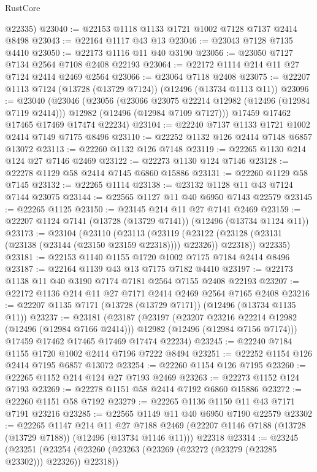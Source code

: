\begin{lexlean}{RustCore}
\begin{coremodule}
      @22335)
@23040 := @22153 @1118 @1133 @1721 @1002 @7128 @7137 @2414 @8498
@23043 := @22164 @1117 @43 @13
@23046 := @23043 @7128 @7135 @4410
@23050 := @22173 @1116 @11 @40 @3190
@23056 := @23050 @7127 @7134 @2564 @7108 @2408 @22193
@23064 := @22172 @1114 @214 @11 @27 @7124 @2414 @2469 @2564
@23066 := @23064 @7118 @2408
@23075 := @22207 @1113 @7124 (@13728 (@13729 @7124)) (@12496 (@13734 @1113 @11))
@23096 := @23040
    (@23046
      (@23056
        (@23066 @23075 @22214 @12982 (@12496 (@12984 @7119 @2414)))
        @12982
        (@12496 (@12984 @7109 @7127)))
      @17459
      @17462
      @17465
      @17469
      @17474
      @22234)
@23104 := @22240 @7137 @1133 @1721 @1002 @2414 @7149 @7175 @8496
@23110 := @22252 @1132 @126 @2414 @7148 @6857 @13072
@23113 := @22260 @1132 @126 @7148
@23119 := @22265 @1130 @214 @124 @27 @7146 @2469
@23122 := @22273 @1130 @124 @7146
@23128 := @22278 @1129 @58 @2414 @7145 @6860 @15886
@23131 := @22260 @1129 @58 @7145
@23132 := @22265 @1114
@23138 := @23132 @1128 @11 @43 @7124 @7144 @23075
@23144 := @22565 @1127 @11 @40 @6950 @7143 @22579
@23145 := @22265 @1125
@23150 := @23145 @214 @11 @27 @7141 @2469
@23159 := @22207 @1124 @7141 (@13728 (@13729 @7141)) (@12496 (@13734 @1124 @11))
@23173 := @23104
    (@23110
      (@23113
        (@23119 (@23122 (@23128 (@23131 (@23138 (@23144 (@23150 @23159 @22318)))) @22326)) @22318))
      @22335)
@23181 := @22153 @1140 @1155 @1720 @1002 @7175 @7184 @2414 @8496
@23187 := @22164 @1139 @43 @13 @7175 @7182 @4410
@23197 := @22173 @1138 @11 @40 @3190 @7174 @7181 @2564 @7155 @2408 @22193
@23207 := @22172 @1136 @214 @11 @27 @7171 @2414 @2469 @2564 @7165 @2408
@23216 := @22207 @1135 @7171 (@13728 (@13729 @7171)) (@12496 (@13734 @1135 @11))
@23237 := @23181
    (@23187
      (@23197
        (@23207 @23216 @22214 @12982 (@12496 (@12984 @7166 @2414)))
        @12982
        (@12496 (@12984 @7156 @7174)))
      @17459
      @17462
      @17465
      @17469
      @17474
      @22234)
@23245 := @22240 @7184 @1155 @1720 @1002 @2414 @7196 @7222 @8494
@23251 := @22252 @1154 @126 @2414 @7195 @6857 @13072
@23254 := @22260 @1154 @126 @7195
@23260 := @22265 @1152 @214 @124 @27 @7193 @2469
@23263 := @22273 @1152 @124 @7193
@23269 := @22278 @1151 @58 @2414 @7192 @6860 @15886
@23272 := @22260 @1151 @58 @7192
@23279 := @22265 @1136 @1150 @11 @43 @7171 @7191 @23216
@23285 := @22565 @1149 @11 @40 @6950 @7190 @22579
@23302 := @22265
    @1147
    @214
    @11
    @27
    @7188
    @2469
    (@22207 @1146 @7188 (@13728 (@13729 @7188)) (@12496 (@13734 @1146 @11)))
    @22318
@23314 := @23245
    (@23251
      (@23254 (@23260 (@23263 (@23269 (@23272 (@23279 (@23285 @23302))) @22326)) @22318))

\end{coremodule}
\end{lexlean}
